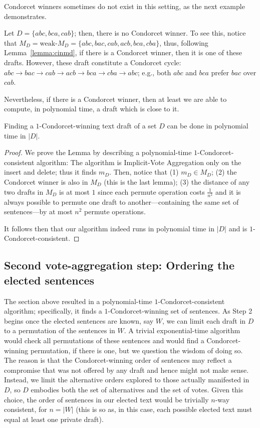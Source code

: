 \documentclass[sigconf]{aamas}  %
\begin{document}
Condorcet winners sometimes do not exist in this setting, as the next example demonstrates.

\begin{example}
%
Let $D = \{abc, bca, cab\}$; then, there is no Condorcet winner. To see this, notice that $M_D = \textrm{weak-}M_D = \{abc, bac, cab, acb, bca, cba\}$, thus, following Lemma~\ref{lemma:cinmd}, if there is a Condorcet winner, then it is one of these drafts. However, these draft constitute a Condorcet cycle: $abc \to bac \to cab \to acb \to bca \to cba \to abc$; e.g., both $abc$ and $bca$ prefer $bac$ over $cab$.
%
\end{example}

Nevertheless, if there is a Condorcet winner, then at least we are able to compute, in polynomial time, a draft which is close to it.

\begin{lemma}
  Finding a $1$-Condorcet-winning text draft of a set $D$ can be done in polynomial time in $|D|$.
\end{lemma}

\begin{proof}
%
We prove the Lemma by describing a polynomial-time $1$-Condorcet-consistent algorithm:
  The algorithm is Implicit-Vote Aggregation only on the insert and delete; thus it finds $m_D$.
Then, notice that
(1) $m_D \in M_D$;
(2) the Condorcet winner is also in $M_D$ (this is the last lemma);
(3) the distance of any two drafts in $M_D$ is at most $1$  since each permute operation costs $\frac{1}{n^2}$ and it is always possible to permute one draft to another---containing the same set of sentences---by at most $n^2$ permute operations.

It follows then that our algorithm indeed runs in polynomial time in $|D|$ and is $1$-Condorcet-consistent.
%
\end{proof}

\subsection{Second vote-aggregation step: Ordering the elected sentences}

The section above resulted in a polynomial-time $1$-Condorcet-consistent algorithm; specifically, it finds a $1$-Condorcet-winning set of sentences.
As Step 2 begins once the elected sentences are known, say $W$, we can limit each draft in $D$ to a permutation of the sentences in $W$.
A trivial exponential-time algorithm would check all permutations of these sentences and would find a Condorcet-winning permutation, if there is one, but we question the wisdom of doing so. The reason is that the Condorcet-winning order of sentences may reflect a compromise that was not offered by any draft and hence might not make sense.
Instead, we limit the alternative orders explored to those actually manifested in $D$, so $D$ embodies both the set of alternatives and the set of votes. Given this choice, the order of sentences in our elected text would be trivially $n$-way consistent, for $n = |W|$
(this is so as, in this case, each possible elected text must equal at least one private draft).
\end{document}
